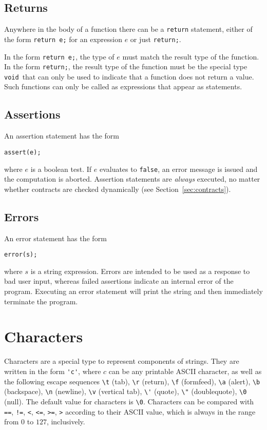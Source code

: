 \documentclass[11pt]{article}
\newcommand{\tvoid}{\texttt{void}}
\begin{document}
\subsection{Returns}

Anywhere in the body of a function there can be a \verb'return'
statement, either of the form \verb'return e;' for an expression $e$
or just \verb'return;'.

In the form \verb'return e;', the type of $e$ must match the result
type of the function.  In the form \verb'return;', the result type of
the function must be the special type \tvoid\ that can only be
used to indicate that a function does not return a value.  Such
functions can only be called as expressions that appear as statements.

\subsection{Assertions}

An assertion statement has the form
\begin{verbatim}
assert(e);
\end{verbatim}
where $e$ is a boolean test.  If $e$ evaluates to \verb'false', an
error message is issued and the computation is aborted.  Assertion
statements are \emph{always} executed, no matter whether contracts are
checked dynamically (see Section~\ref{sec:contracts}).

\subsection{Errors}

An error statement has the form
\begin{verbatim}
error(s);
\end{verbatim}
where $s$ is a string expression. Errors are intended to be used as a
response to bad user input, whereas failed assertions indicate an
internal error of the program. Executing an error statement will print
the string and then immediately terminate the program.

\section{Characters}

Characters are a special type to represent components of strings.
They are written in the form \verb!'c'!, where $c$ can be any printable
ASCII character, as well as the following escape sequences \verb'\t'
(tab), \verb'\r' (return), \verb'\f' (formfeed), \verb'\a' (alert),
\verb'\b' (backspace), \verb'\n' (newline), \verb'\v' (vertical tab),
\verb!\'! (quote), \verb'\"' (doublequote), \verb'\0' (null).  The
default value for characters is \verb'\0'.  Characters can be compared
with \verb'==', \verb'!=', \verb'<', \verb'<=', \verb'>=', \verb'>'
according to their ASCII value, which is always in the range from $0$
to $127$, inclusively.
\end{document}
